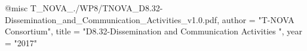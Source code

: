 @misc{ T_NOVA_./WP8/TNOVA_D8.32-Dissemination_and_Communication_Activities_v1.0.pdf,
       author = "{T-NOVA Consortium}",
       title = "D8.32-Dissemination and Communication Activities ",
       year = "2017" }
